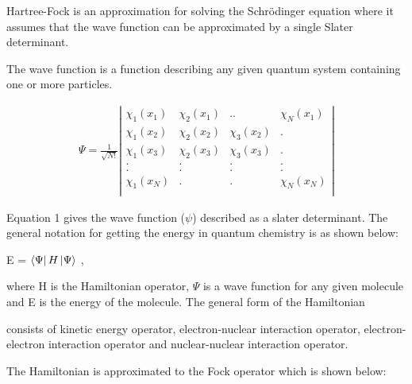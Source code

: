 \documentclass[twoside]{article}
\begin{document}
 Hartree-Fock is an approximation for solving the Schrödinger equation 
where it assumes that the wave function can be approximated by a single Slater determinant.  

The wave function is a function describing any given quantum system containing one or more particles. 



\begin{eqnarray}
\Psi=
\frac{1}{\sqrt{N!}}\left|
\begin{array}{cccc}
\chi_1(x_1)&\chi_2(x_1)&..&\chi_N(x_1)\\
\chi_1(x_2)&\chi_2(x_2)&\chi_3(x_2)&.\\
\chi_1(x_3)&\chi_2(x_3)&\chi_3(x_3)&.\\
.&.&.&.\\
.&.&.&.\\
\chi_1(x_N)&.&.&\chi_N(x_N)\\
\end{array}
\right|
\end{eqnarray}


Equation 1 gives the wave function ($\psi$) described as a slater determinant. The general notation for getting the energy in quantum chemistry is as shown below:


E = $\Bra{\Psi}H\Ket{\Psi}$ ,

where H is the Hamiltonian operator, $\Psi$ is a wave function for any given molecule and E is the energy of the molecule. The general form of the Hamiltonian 

consists of kinetic energy operator, electron-nuclear interaction operator, electron-electron interaction operator and nuclear-nuclear interaction operator.

 The Hamiltonian is approximated to the Fock operator which is shown below:
\end{document}
